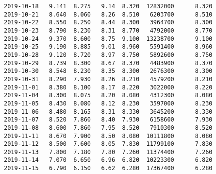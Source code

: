 \documentclass[11pt]{article}
\begin{document}
\begin{Verbatim}[commandchars=\\\{\}]
2019-10-18   9.141  8.275   9.14  8.320  12832000      8.320
2019-10-21   8.640  8.060   8.26  8.510   6203700      8.510
2019-10-22   8.550  8.250   8.44  8.300   3964700      8.300
2019-10-23   8.790  8.230   8.31  8.770   4792000      8.770
2019-10-24   9.370  8.600   8.75  9.100  13238700      9.100
2019-10-25   9.190  8.885   9.01  8.960   5591400      8.960
2019-10-28   9.120  8.720   8.97  8.750   5892600      8.750
2019-10-29   8.739  8.300   8.67  8.370   4483900      8.370
2019-10-30   8.548  8.230   8.35  8.300   2676300      8.300
2019-10-31   8.290  7.930   8.26  8.210   4579200      8.210
2019-11-01   8.380  8.100   8.17  8.220   3022000      8.220
2019-11-04   8.300  8.075   8.20  8.080   4312300      8.080
2019-11-05   8.430  8.080   8.12  8.230   3597000      8.230
2019-11-06   8.480  8.165   8.31  8.330   3645200      8.330
2019-11-07   8.520  7.860   8.40  7.930   6158600      7.930
2019-11-08   8.600  7.860   7.95  8.520   7910300      8.520
2019-11-11   8.670  7.900   8.50  8.080  10111800      8.080
2019-11-12   8.500  7.600   8.05  7.830  11799100      7.830
2019-11-13   7.800  7.180   7.80  7.260  11374400      7.260
2019-11-14   7.070  6.650   6.96  6.820  10223300      6.820
2019-11-15   6.790  6.150   6.62  6.280  17367400      6.280


\end{Verbatim}
\end{document}
